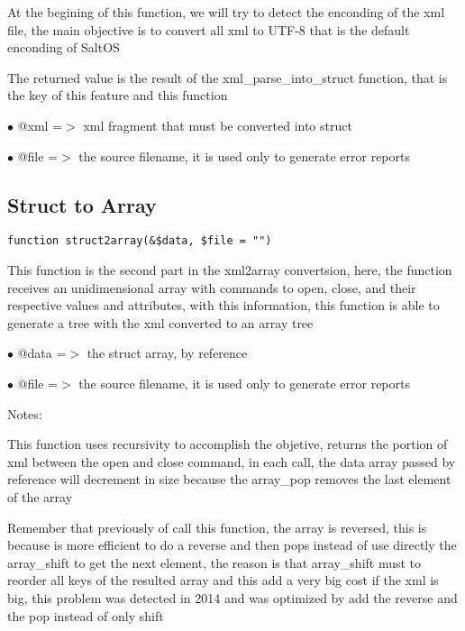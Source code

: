 \documentclass[a4paper]{book}
\begin{document}
At the begining of this function, we will try to detect the enconding of the
xml file, the main objective is to convert all xml to UTF-8 that is the default
enconding of SaltOS

The returned value is the result of the xml\_parse\_into\_struct function, that is
the key of this feature and this function

\begin{compactitem}
\item[\color{myblue}$\bullet$] @xml  =$>$ xml fragment that must be converted into struct
\item[\color{myblue}$\bullet$] @file =$>$ the source filename, it is used only to generate error reports
\end{compactitem}

\hypertarget{toc325}{}
\subsection{Struct to Array}

\begin{lstlisting}
function struct2array(&$data, $file = "")
\end{lstlisting}

This function is the second part in the xml2array convertsion, here, the function
receives an unidimensional array with commands to open, close, and their respective
values and attributes, with this information, this function is able to generate a
tree with the xml converted to an array tree

\begin{compactitem}
\item[\color{myblue}$\bullet$] @data =$>$ the struct array, by reference
\item[\color{myblue}$\bullet$] @file =$>$ the source filename, it is used only to generate error reports
\end{compactitem}

Notes:

This function uses recursivity to accomplish the objetive, returns the portion
of xml between the open and close command, in each call, the data array passed
by reference will decrement in size because the array\_pop removes the last element
of the array

Remember that previously of call this function, the array is reversed, this is
because is more efficient to do a reverse and then pops instead of use directly
the array\_shift to get the next element, the reason is that array\_shift must to
reorder all keys of the resulted array and this add a very big cost if the xml
is big, this problem was detected in 2014 and was optimized by add the reverse
and the pop instead of only shift
\end{document}
